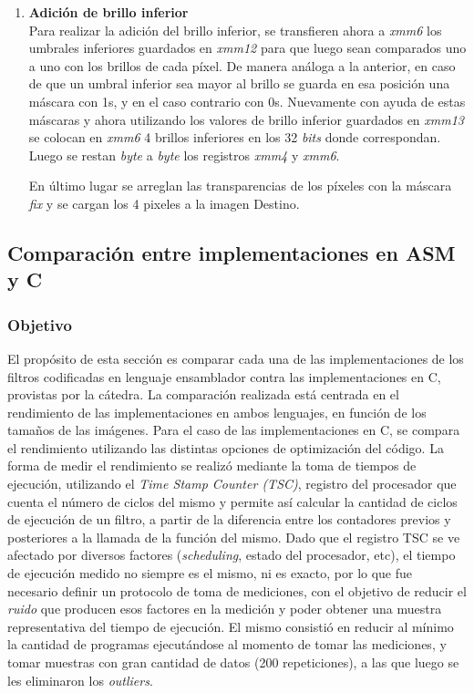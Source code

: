 \documentclass[a4paper]{article}
\begin{document}
\begin{enumerate}
 	\item \textbf{Adición de brillo inferior}\\
 	
 	Para realizar la adición del brillo inferior, se transfieren ahora a \textit{xmm6} los umbrales inferiores guardados en \textit{xmm12} para que luego sean comparados uno a uno con los brillos de cada píxel. De manera análoga a la anterior, en caso de que un umbral inferior sea mayor al brillo se guarda en esa posición una máscara con 1s, y en el caso contrario con 0s. Nuevamente con ayuda de estas máscaras y ahora utilizando los valores de brillo inferior guardados en \textit{xmm13} se colocan en \textit{xmm6} 4 brillos inferiores en los 32 \textit{bits} donde correspondan. Luego se restan \textit{byte} a \textit{byte} los registros \textit{xmm4} y \textit{xmm6}.
 	
 	En último lugar se arreglan las transparencias de los píxeles con la máscara \textit{fix} y se cargan los 4 pixeles a la imagen Destino.
 	    
 \end{enumerate}


\subsection{Comparación entre implementaciones en ASM y C}
\subsubsection{Objetivo}
\justify
El propósito de esta sección es comparar cada una de las implementaciones de los filtros codificadas en lenguaje ensamblador contra las implementaciones en C, provistas por la cátedra. La comparación realizada está centrada en el rendimiento de las implementaciones en ambos lenguajes, en función de los tamaños de las imágenes. Para el caso de las implementaciones en C, se compara el rendimiento utilizando las distintas opciones de optimización del código. 
\justify
La forma de medir el rendimiento se realizó mediante la toma de tiempos de ejecución, utilizando el \textit{Time Stamp Counter (TSC)}, registro del procesador que cuenta el número de ciclos del mismo y permite así calcular la cantidad de ciclos de ejecución de un filtro, a partir de la diferencia entre los contadores previos y posteriores a la llamada de la función del mismo. 
\justify
Dado que el registro TSC se ve afectado por diversos factores (\textit{scheduling}, estado del procesador, etc), el tiempo de ejecución medido no siempre es el mismo, ni es exacto, por lo que fue necesario definir un protocolo de toma de mediciones, con el objetivo de reducir el \textit{ruido} que producen esos factores en la medición y poder obtener una muestra representativa del tiempo de ejecución. El mismo consistió en reducir al mínimo la cantidad de programas ejecutándose al momento de tomar las mediciones, y tomar muestras con gran cantidad de datos (200 repeticiones), a las que luego se les eliminaron los \textit{outliers}.
\justify
\end{document}
